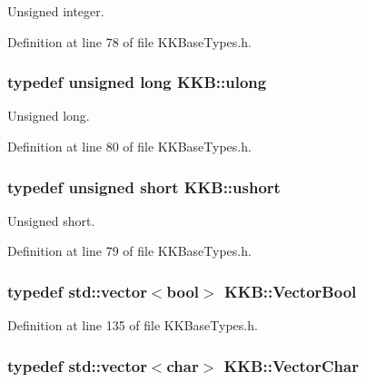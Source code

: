 Unsigned integer. 



Definition at line 78 of file K\+K\+Base\+Types.\+h.

\subsubsection[{\texorpdfstring{ulong}{ulong}}]{\setlength{\rightskip}{0pt plus 5cm}typedef unsigned long {\bf K\+K\+B\+::ulong}}\hypertarget{namespace_k_k_b_ad16da29960588b11a873b8b16b197396}{}\label{namespace_k_k_b_ad16da29960588b11a873b8b16b197396}


Unsigned long. 



Definition at line 80 of file K\+K\+Base\+Types.\+h.

\subsubsection[{\texorpdfstring{ushort}{ushort}}]{\setlength{\rightskip}{0pt plus 5cm}typedef unsigned short {\bf K\+K\+B\+::ushort}}\hypertarget{namespace_k_k_b_a4a7e2d1bab49f38edf25c38a8dc20012}{}\label{namespace_k_k_b_a4a7e2d1bab49f38edf25c38a8dc20012}


Unsigned short. 



Definition at line 79 of file K\+K\+Base\+Types.\+h.

\subsubsection[{\texorpdfstring{Vector\+Bool}{VectorBool}}]{\setlength{\rightskip}{0pt plus 5cm}typedef std\+::vector$<$bool$>$ {\bf K\+K\+B\+::\+Vector\+Bool}}\hypertarget{namespace_k_k_b_a14c7fc0d2e2c8b80878017f195980b89}{}\label{namespace_k_k_b_a14c7fc0d2e2c8b80878017f195980b89}


Definition at line 135 of file K\+K\+Base\+Types.\+h.

\subsubsection[{\texorpdfstring{Vector\+Char}{VectorChar}}]{\setlength{\rightskip}{0pt plus 5cm}typedef std\+::vector$<$char$>$ {\bf K\+K\+B\+::\+Vector\+Char}}\hypertarget{namespace_k_k_b_ac5763efba6ccdbee14392d153dd69809}{}\label{namespace_k_k_b_ac5763efba6ccdbee14392d153dd69809}


